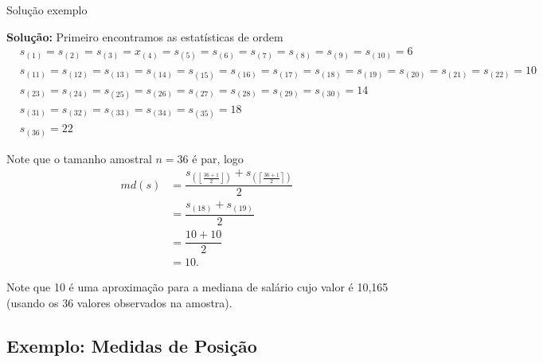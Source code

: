 \documentclass[8pt]{beamer}
\begin{document}
\begin{frame}{Solução exemplo}
  
  \textbf{Solução:} Primeiro encontramos as estatísticas de ordem
  \begin{align*}
   &s_{(1)} = s_{(2)}=s_{(3)}=x_{(4)}=s_{(5)}=s_{(6)}=s_{(7)}=s_{(8)}=s_{(9)}=s_{(10)}=6\\
   &s_{(11)} = s_{(12)}=s_{(13)}=s_{(14)}=s_{(15)}=s_{(16)}=s_{(17)}=s_{(18)}=s_{(19)}=s_{(20)}=s_{(21)}=s_{(22)}=10\\
   &s_{(23)} = s_{(24)}=s_{(25)}=s_{(26)}=s_{(27)}=s_{(28)}=s_{(29)}=s_{(30)}=14\\
   &s_{(31)} = s_{(32)}=s_{(33)}=s_{(34)}=s_{(35)}=18\\
   &s_{(36)} = 22
  \end{align*}
 
 Note que o tamanho amostral $n=36$ é par, logo
 \begin{align*}
  md(s)&=\dfrac{ s_{\left( \left\lfloor \frac{36+1}{2} \right\rfloor \right)}+s_{\left( \left\lceil \frac{36+1}{2} \right\rceil \right)}}{2}\\
  &=\dfrac{ s_{(18)}+s_{(19)}}{2}\\
  &= \dfrac{10+10}{2}\\
  &=10.
 \end{align*}
 
 {\color{blue} Note que 10 é uma aproximação para a mediana de salário cujo valor é 10,165 (usando os 36 valores observados na amostra). }
\end{frame}

\subsection{Exemplo: Medidas de Posição}
\end{document}
